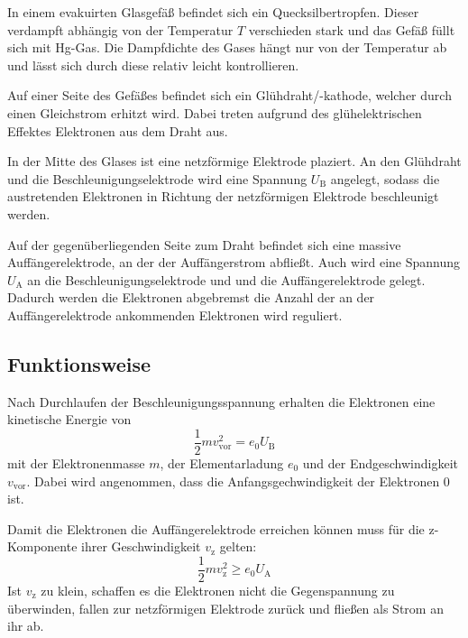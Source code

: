 \documentclass[titlepage = firstcover]{scrartcl}
\begin{document}
            \FloatBarrier

            In einem evakuirten Glasgefäß befindet sich ein Quecksilbertropfen.
            Dieser verdampft abhängig von der Temperatur $T$ verschieden stark und das Gefäß füllt sich mit Hg-Gas.
            Die Dampfdichte des Gases hängt nur von der Temperatur ab und lässt sich durch diese relativ leicht kontrollieren.

            Auf einer Seite des Gefäßes befindet sich ein Glühdraht/-kathode, welcher durch einen Gleichstrom erhitzt wird.
            Dabei treten aufgrund des glühelektrischen Effektes Elektronen aus dem Draht aus.

            In der Mitte des Glases ist eine netzförmige Elektrode plaziert.
            An den Glühdraht und die Beschleunigungselektrode wird eine Spannung $U_{\text{B}}$ angelegt, sodass die austretenden Elektronen in Richtung der netzförmigen Elektrode beschleunigt werden.

            Auf der gegenüberliegenden Seite zum Draht befindet sich eine massive Auffängerelektrode, an der der Auffängerstrom abfließt.
            Auch wird eine Spannung $U_{\text{A}}$ an die Beschleunigungselektrode und und die Auffängerelektrode gelegt.
            Dadurch werden die Elektronen abgebremst die Anzahl der an der Auffängerelektrode ankommenden Elektronen wird reguliert.

        \subsection{Funktionsweise}
            Nach Durchlaufen der Beschleunigungsspannung erhalten die Elektronen eine kinetische Energie von
            \begin{equation*}
                \frac{1}{2} m v^2_{\text{vor}} = e_0 U_{\text{B}}
            \end{equation*}
            mit der Elektronenmasse $m$, der Elementarladung $e_0$ und der Endgeschwindigkeit $v_{\text{vor}}$.
            Dabei wird angenommen, dass die Anfangsgechwindigkeit der Elektronen 0 ist.

            Damit die Elektronen die Auffängerelektrode erreichen können muss für die z-Komponente ihrer Geschwindigkeit $v_{\text{z}}$ gelten:
            \begin{equation*}
                \frac{1}{2} m v^2_{\text{z}} \geq e_0 U_{\text{A}}
            \end{equation*}
            Ist $v_{\text{z}}$ zu klein, schaffen es die Elektronen nicht die Gegenspannung zu überwinden, fallen zur netzförmigen Elektrode zurück und fließen als Strom an ihr ab. \\
\end{document}
